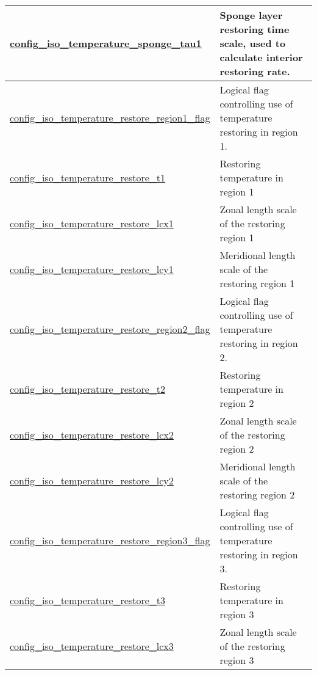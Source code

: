 {\begin{center}
\begin{longtable}{| p{2.0in} || p{4.0in} |}
    \hline
    \hyperref[subsec:nm_sec_config_iso_temperature_sponge_tau1]{config\_iso\_temperature\_\-sponge\_tau1} & Sponge layer restoring time scale, used to calculate interior restoring rate. \\
    \hline
    \hyperref[subsec:nm_sec_config_iso_temperature_restore_region1_flag]{config\_iso\_temperature\_\-restore\_region1\_flag} & Logical flag controlling use of temperature restoring in region 1. \\
    \hline
    \hyperref[subsec:nm_sec_config_iso_temperature_restore_t1]{config\_iso\_temperature\_\-restore\_t1} & Restoring temperature in region 1 \\
    \hline
    \hyperref[subsec:nm_sec_config_iso_temperature_restore_lcx1]{config\_iso\_temperature\_\-restore\_lcx1} & Zonal length scale of the restoring region 1 \\
    \hline
    \hyperref[subsec:nm_sec_config_iso_temperature_restore_lcy1]{config\_iso\_temperature\_\-restore\_lcy1} & Meridional length scale of the restoring region 1 \\
    \hline
    \hyperref[subsec:nm_sec_config_iso_temperature_restore_region2_flag]{config\_iso\_temperature\_\-restore\_region2\_flag} & Logical flag controlling use of temperature restoring in region 2. \\
    \hline
    \hyperref[subsec:nm_sec_config_iso_temperature_restore_t2]{config\_iso\_temperature\_\-restore\_t2} & Restoring temperature in region 2 \\
    \hline
    \hyperref[subsec:nm_sec_config_iso_temperature_restore_lcx2]{config\_iso\_temperature\_\-restore\_lcx2} & Zonal length scale of the restoring region 2 \\
    \hline
    \hyperref[subsec:nm_sec_config_iso_temperature_restore_lcy2]{config\_iso\_temperature\_\-restore\_lcy2} & Meridional length scale of the restoring region 2 \\
    \hline
    \hyperref[subsec:nm_sec_config_iso_temperature_restore_region3_flag]{config\_iso\_temperature\_\-restore\_region3\_flag} & Logical flag controlling use of temperature restoring in region 3. \\
    \hline
    \hyperref[subsec:nm_sec_config_iso_temperature_restore_t3]{config\_iso\_temperature\_\-restore\_t3} & Restoring temperature in region 3 \\
    \hline
    \hyperref[subsec:nm_sec_config_iso_temperature_restore_lcx3]{config\_iso\_temperature\_\-restore\_lcx3} & Zonal length scale of the restoring region 3 \\

\end{longtable}
\end{center}}
